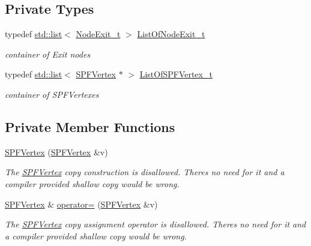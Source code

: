 \subsection*{Private Types}
\begin{DoxyCompactItemize}
\item 
typedef \hyperlink{openflow-interface_8h_afd9bcfa176617760671b67580f536fa7}{std\+::list}$<$ \hyperlink{classns3_1_1SPFVertex_a0adf6255ec0357050ef5436597b4cb32}{Node\+Exit\+\_\+t} $>$ \hyperlink{classns3_1_1SPFVertex_a58c08273e2ed8ce059f70c6afcf89e3f}{List\+Of\+Node\+Exit\+\_\+t}
\begin{DoxyCompactList}\small\item\em container of Exit nodes \end{DoxyCompactList}\item 
typedef \hyperlink{openflow-interface_8h_afd9bcfa176617760671b67580f536fa7}{std\+::list}$<$ \hyperlink{classns3_1_1SPFVertex}{S\+P\+F\+Vertex} $\ast$ $>$ \hyperlink{classns3_1_1SPFVertex_a505cf50e80726f5860b32e9dc34b6c9e}{List\+Of\+S\+P\+F\+Vertex\+\_\+t}
\begin{DoxyCompactList}\small\item\em container of S\+P\+F\+Vertexes \end{DoxyCompactList}\end{DoxyCompactItemize}
\subsection*{Private Member Functions}
\begin{DoxyCompactItemize}
\item 
\hyperlink{classns3_1_1SPFVertex_aa3c471ef7c7142ac847515b172fa293a}{S\+P\+F\+Vertex} (\hyperlink{classns3_1_1SPFVertex}{S\+P\+F\+Vertex} \&v)
\begin{DoxyCompactList}\small\item\em The \hyperlink{classns3_1_1SPFVertex}{S\+P\+F\+Vertex} copy construction is disallowed. There\textquotesingle{}s no need for it and a compiler provided shallow copy would be wrong. \end{DoxyCompactList}\item 
\hyperlink{classns3_1_1SPFVertex}{S\+P\+F\+Vertex} \& \hyperlink{classns3_1_1SPFVertex_a1093b26201ad628c3acd878c8ae34ad7}{operator=} (\hyperlink{classns3_1_1SPFVertex}{S\+P\+F\+Vertex} \&v)
\begin{DoxyCompactList}\small\item\em The \hyperlink{classns3_1_1SPFVertex}{S\+P\+F\+Vertex} copy assignment operator is disallowed. There\textquotesingle{}s no need for it and a compiler provided shallow copy would be wrong. \end{DoxyCompactList}\end{DoxyCompactItemize}
